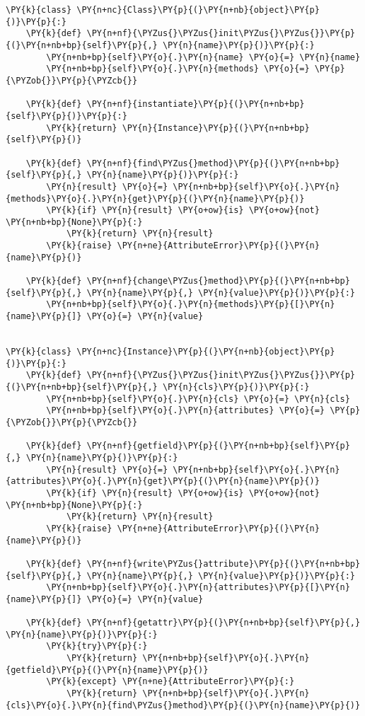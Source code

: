 \begin{Verbatim}[commandchars=\\\{\}]
\PY{k}{class} \PY{n+nc}{Class}\PY{p}{(}\PY{n+nb}{object}\PY{p}{)}\PY{p}{:}
    \PY{k}{def} \PY{n+nf}{\PYZus{}\PYZus{}init\PYZus{}\PYZus{}}\PY{p}{(}\PY{n+nb+bp}{self}\PY{p}{,} \PY{n}{name}\PY{p}{)}\PY{p}{:}
        \PY{n+nb+bp}{self}\PY{o}{.}\PY{n}{name} \PY{o}{=} \PY{n}{name}
        \PY{n+nb+bp}{self}\PY{o}{.}\PY{n}{methods} \PY{o}{=} \PY{p}{\PYZob{}}\PY{p}{\PYZcb{}}

    \PY{k}{def} \PY{n+nf}{instantiate}\PY{p}{(}\PY{n+nb+bp}{self}\PY{p}{)}\PY{p}{:}
        \PY{k}{return} \PY{n}{Instance}\PY{p}{(}\PY{n+nb+bp}{self}\PY{p}{)}

    \PY{k}{def} \PY{n+nf}{find\PYZus{}method}\PY{p}{(}\PY{n+nb+bp}{self}\PY{p}{,} \PY{n}{name}\PY{p}{)}\PY{p}{:}
        \PY{n}{result} \PY{o}{=} \PY{n+nb+bp}{self}\PY{o}{.}\PY{n}{methods}\PY{o}{.}\PY{n}{get}\PY{p}{(}\PY{n}{name}\PY{p}{)}
        \PY{k}{if} \PY{n}{result} \PY{o+ow}{is} \PY{o+ow}{not} \PY{n+nb+bp}{None}\PY{p}{:}
            \PY{k}{return} \PY{n}{result}
        \PY{k}{raise} \PY{n+ne}{AttributeError}\PY{p}{(}\PY{n}{name}\PY{p}{)}

    \PY{k}{def} \PY{n+nf}{change\PYZus{}method}\PY{p}{(}\PY{n+nb+bp}{self}\PY{p}{,} \PY{n}{name}\PY{p}{,} \PY{n}{value}\PY{p}{)}\PY{p}{:}
        \PY{n+nb+bp}{self}\PY{o}{.}\PY{n}{methods}\PY{p}{[}\PY{n}{name}\PY{p}{]} \PY{o}{=} \PY{n}{value}


\PY{k}{class} \PY{n+nc}{Instance}\PY{p}{(}\PY{n+nb}{object}\PY{p}{)}\PY{p}{:}
    \PY{k}{def} \PY{n+nf}{\PYZus{}\PYZus{}init\PYZus{}\PYZus{}}\PY{p}{(}\PY{n+nb+bp}{self}\PY{p}{,} \PY{n}{cls}\PY{p}{)}\PY{p}{:}
        \PY{n+nb+bp}{self}\PY{o}{.}\PY{n}{cls} \PY{o}{=} \PY{n}{cls}
        \PY{n+nb+bp}{self}\PY{o}{.}\PY{n}{attributes} \PY{o}{=} \PY{p}{\PYZob{}}\PY{p}{\PYZcb{}}

    \PY{k}{def} \PY{n+nf}{getfield}\PY{p}{(}\PY{n+nb+bp}{self}\PY{p}{,} \PY{n}{name}\PY{p}{)}\PY{p}{:}
        \PY{n}{result} \PY{o}{=} \PY{n+nb+bp}{self}\PY{o}{.}\PY{n}{attributes}\PY{o}{.}\PY{n}{get}\PY{p}{(}\PY{n}{name}\PY{p}{)}
        \PY{k}{if} \PY{n}{result} \PY{o+ow}{is} \PY{o+ow}{not} \PY{n+nb+bp}{None}\PY{p}{:}
            \PY{k}{return} \PY{n}{result}
        \PY{k}{raise} \PY{n+ne}{AttributeError}\PY{p}{(}\PY{n}{name}\PY{p}{)}

    \PY{k}{def} \PY{n+nf}{write\PYZus{}attribute}\PY{p}{(}\PY{n+nb+bp}{self}\PY{p}{,} \PY{n}{name}\PY{p}{,} \PY{n}{value}\PY{p}{)}\PY{p}{:}
        \PY{n+nb+bp}{self}\PY{o}{.}\PY{n}{attributes}\PY{p}{[}\PY{n}{name}\PY{p}{]} \PY{o}{=} \PY{n}{value}

    \PY{k}{def} \PY{n+nf}{getattr}\PY{p}{(}\PY{n+nb+bp}{self}\PY{p}{,} \PY{n}{name}\PY{p}{)}\PY{p}{:}
        \PY{k}{try}\PY{p}{:}
            \PY{k}{return} \PY{n+nb+bp}{self}\PY{o}{.}\PY{n}{getfield}\PY{p}{(}\PY{n}{name}\PY{p}{)}
        \PY{k}{except} \PY{n+ne}{AttributeError}\PY{p}{:}
            \PY{k}{return} \PY{n+nb+bp}{self}\PY{o}{.}\PY{n}{cls}\PY{o}{.}\PY{n}{find\PYZus{}method}\PY{p}{(}\PY{n}{name}\PY{p}{)}
\end{Verbatim}
